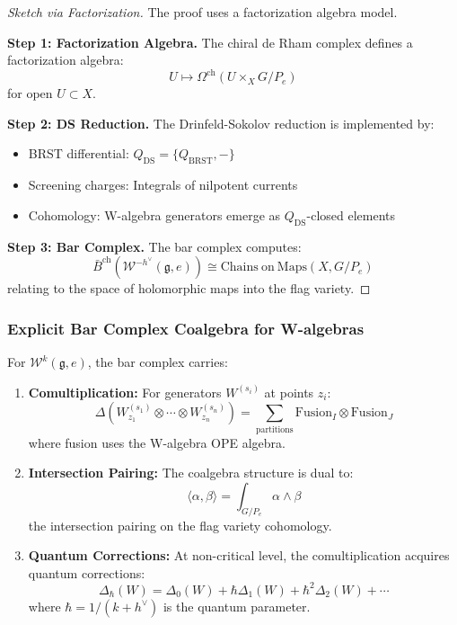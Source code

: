 \begin{proof}[Sketch via Factorization]
The proof uses a factorization algebra model.

\textbf{Step 1: Factorization Algebra.} The chiral de Rham complex defines a factorization algebra:
\[
U \mapsto \Omega^{\mathrm{ch}}(U \times_{X} G/P_e)
\]
for open $U \subset X$.

\textbf{Step 2: DS Reduction.} The Drinfeld-Sokolov reduction is implemented by:
\begin{itemize}
\item BRST differential: $Q_{\mathrm{DS}} = \{Q_{\mathrm{BRST}}, -\}$
\item Screening charges: Integrals of nilpotent currents
\item Cohomology: W-algebra generators emerge as $Q_{\mathrm{DS}}$-closed elements
\end{itemize}

\textbf{Step 3: Bar Complex.} The bar complex computes:
\[
\bar{B}^{\mathrm{ch}}(\mathcal{W}^{-h^\vee}(\mathfrak{g}, e)) \cong \mathrm{Chains\ on\ Maps}(X, G/P_e)
\]
relating to the space of holomorphic maps into the flag variety.
\end{proof}

\subsubsection{Explicit Bar Complex Coalgebra for W-algebras}

\begin{theorem}\label{thm:w-bar-coalg}
For $\mathcal{W}^k(\mathfrak{g}, e)$, the bar complex carries:
\begin{enumerate}
\item \textbf{Comultiplication:} For generators $W^{(s_i)}$ at points $z_i$:
\[
\Delta(W^{(s_1)}_{z_1} \otimes \cdots \otimes W^{(s_n)}_{z_n}) = 
\sum_{\text{partitions}} \mathrm{Fusion}_I \otimes \mathrm{Fusion}_J
\]
where fusion uses the W-algebra OPE algebra.

\item \textbf{Intersection Pairing:} The coalgebra structure is dual to:
\[
\langle \alpha, \beta \rangle = \int_{G/P_e} \alpha \wedge \beta
\]
the intersection pairing on the flag variety cohomology.

\item \textbf{Quantum Corrections:} At non-critical level, the comultiplication acquires quantum corrections:
\[
\Delta_{\hbar}(W) = \Delta_0(W) + \hbar \Delta_1(W) + \hbar^2 \Delta_2(W) + \cdots
\]
where $\hbar = 1/(k + h^\vee)$ is the quantum parameter.
\end{enumerate}
\end{theorem}

